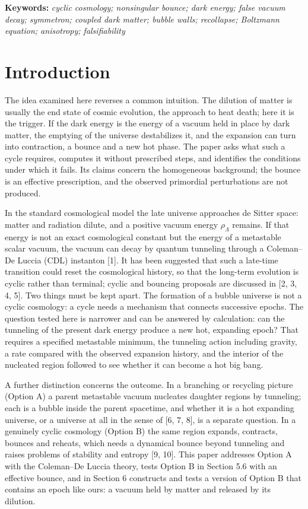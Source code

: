 \documentclass[11pt,a4paper]{article}
\begin{document}
\noindent\textbf{Keywords:} \emph{cyclic cosmology; nonsingular bounce; dark energy; false vacuum decay; symmetron; coupled dark matter; bubble walls; recollapse; Boltzmann equation; anisotropy; falsifiability}

\section{Introduction}
The idea examined here reverses a common intuition. The dilution of matter is usually the end state of cosmic evolution, the approach to heat death; here it is the trigger. If the dark energy is the energy of a vacuum held in place by dark matter, the emptying of the universe destabilizes it, and the expansion can turn into contraction, a bounce and a new hot phase. The paper asks what such a cycle requires, computes it without prescribed steps, and identifies the conditions under which it fails. Its claims concern the homogeneous background; the bounce is an effective prescription, and the observed primordial perturbations are not produced.

In the standard cosmological model the late universe approaches de Sitter space: matter and radiation dilute, and a positive vacuum energy $\rho_\Lambda$ remains. If that energy is not an exact cosmological constant but the energy of a metastable scalar vacuum, the vacuum can decay by quantum tunneling through a Coleman--De Luccia (CDL) instanton [1]. It has been suggested that such a late-time transition could reset the cosmological history, so that the long-term evolution is cyclic rather than terminal; cyclic and bouncing proposals are discussed in [2, 3, 4, 5]. Two things must be kept apart. The formation of a bubble universe is not a cyclic cosmology: a cycle needs a mechanism that connects successive epochs. The question tested here is narrower and can be answered by calculation: can the tunneling of the present dark energy produce a new hot, expanding epoch? That requires a specified metastable minimum, the tunneling action including gravity, a rate compared with the observed expansion history, and the interior of the nucleated region followed to see whether it can become a hot big bang.

A further distinction concerns the outcome. In a branching or recycling picture (Option A) a parent metastable vacuum nucleates daughter regions by tunneling; each is a bubble inside the parent spacetime, and whether it is a hot expanding universe, or a universe at all in the sense of [6, 7, 8], is a separate question. In a genuinely cyclic cosmology (Option B) the same region expands, contracts, bounces and reheats, which needs a dynamical bounce beyond tunneling and raises problems of stability and entropy [9, 10]. This paper addresses Option A with the Coleman--De Luccia theory, tests Option B in Section 5.6 with an effective bounce, and in Section 6 constructs and tests a version of Option B that contains an epoch like ours: a vacuum held by matter and released by its dilution.
\end{document}
